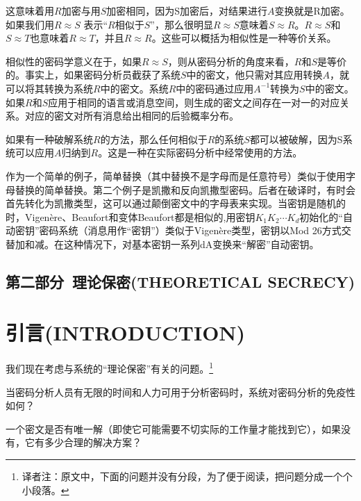 \documentclass[]{article}
\begin{document}
这意味着用$R$加密与用$S$加密相同，因为S加密后，对结果进行$A$变换就是R加密。如果我们用$R\approx S$ 表示“$R$相似于$S$”，那么很明显$R\approx S$意味着$S\approx R$。$R\approx S$和$S\approx T$也意味着$R\approx T$，并且$R\approx R$。这些可以概括为相似性是一种等价关系。

相似性的密码学意义在于，如果$R\approx S$，则从密码分析的角度来看，$R$和$S$是等价的。事实上，如果密码分析员截获了系统$S$中的密文，他只需对其应用转换$A$，就可以将其转换为系统$R$中的密文。系统$R$中的密码通过应用$A^{-1}$转换为$S$中的密文。如果$R$和$S$应用于相同的语言或消息空间，则生成的密文之间存在一对一的对应关系。对应的密文对所有消息给出相同的后验概率分布。

如果有一种破解系统$R$的方法，那么任何相似于$R$的系统$S$都可以被破解，因为S系统可以应用$A$归纳到$R$。这是一种在实际密码分析中经常使用的方法。

作为一个简单的例子，简单替换（其中替换不是字母而是任意符号）类似于使用字母替换的简单替换。第二个例子是凯撒和反向凯撒型密码。后者在破译时，有时会首先转化为凯撒类型，这可以通过颠倒密文中的字母表来实现。当密钥是随机的时，Vigen\`{e}re、Beaufort和变体Beaufort都是相似的,用密钥$K_1 K_2\cdots K_d$初始化的“自动密钥”密码系统（消息用作“密钥”）类似于Vigen\`{e}re类型，密钥以Mod 26方式交替加和减。在这种情况下，对基本密钥一系列dA变换来“解密”自动密钥。

\newpage

\begin{center}
	\section*{第二部分\ 理论保密(THEORETICAL SECRECY)}
\end{center}

%   
%

\section{引言(INTRODUCTION)}

我们现在考虑与系统的“理论保密”有关的问题。\footnote{译者注：原文中，下面的问题并没有分段，为了便于阅读，把问题分成一个个小段落。}\par

当密码分析人员有无限的时间和人力可用于分析密码时，系统对密码分析的免疫性如何？\par

一个密文是否有唯一解（即使它可能需要不切实际的工作量才能找到它），如果没有，它有多少合理的解决方案？\par
\end{document}
